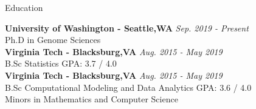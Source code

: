 \documentclass{resume} %
\begin{document}

\begin{rSection}{Education}

{\bf University of Washington - Seattle,WA} \hfill {\em Sep. 2019 - Present}
\\ Ph.D in Genome Sciences \smallskip \\
{\bf Virginia Tech - Blacksburg,VA} \hfill {\em Aug. 2015 - May 2019}
\\ B.Sc Statistics \hfill { GPA: 3.7 / 4.0} \smallskip
\\{\bf Virginia Tech - Blacksburg,VA} \hfill {\em Aug. 2015 - May 2019}
\\ B.Sc Computational Modeling and Data Analytics \hfill { GPA: 3.6 / 4.0 } \smallskip  \\
Minors in Mathematics and Computer Science
\end{rSection}




\end{document}
